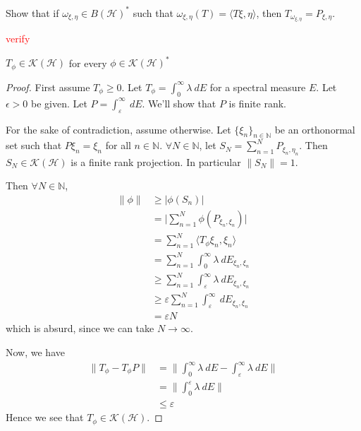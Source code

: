 

\begin{exercise}
  Show that if $\omega_{\xi, \eta} \in B(\mathcal{H})^*$ such that
  $\omega_{\xi, \eta}(T) = \langle T \xi ,  \eta \rangle $, then
  $T_{\omega_{\xi, \eta}} = P_{\xi, \eta}$.
\end{exercise}
\begin{solution}
  \textcolor{red}{verify}
\end{solution}

\begin{theorem}
  $T_\phi \in \mathcal{K}(\mathcal{H})$ for every $\phi \in
  \mathcal{K}(\mathcal{H})^*$
\end{theorem}
\begin{proof}
  First assume $T_\phi \ge 0$. Let $T_\phi = \int_{0}^{\infty}
  \lambda \ d E$ for a spectral measure $E$. Let $\epsilon > 0$ be
  given. Let $P = \int_{\varepsilon}^{\infty}  \ dE$. We'll show that
  $P$ is finite rank.

  For the sake of contradiction, assume
  otherwise. Let $\{ \xi_n \}_{n \in \mathbb{N}}$ be an orthonormal
  set such that $P \xi_n =  \xi_n$ for all $n \in \mathbb{N}$.
  $\forall N \in \mathbb{N}$, let $S_N = \sum_{n = 1}^{N} P_{\xi_n,
  \eta_n}$. Then $S_N \in \mathcal{K}(\mathcal{H})$ is a finite rank
  projection. In particular $\|S_N\| = 1$.

  Then $\forall N \in \mathbb{N}$,
  \begin{align*}
    \|\phi\| & \ge |\phi(S_n)| \\
    & = \Big| \sum_{ n = 1}^{N} \phi(P_{\xi_n, \xi_n}) \Big| \\
    & = \sum_{n = 1}^{N} \langle T_\phi \xi_n , \xi_n \rangle \\
    & = \sum_{n = 1}^{N} \int_{0}^{\infty}  \lambda \ d E_{\xi_n, \xi_n} \\
    & \ge \sum_{n = 1}^{N} \int_{\varepsilon}^{\infty}  \lambda \ d
    E_{\xi_n, \xi_n} \\
    & \ge \varepsilon \sum_{n = 1}^{N} \int_{\varepsilon}^{\infty}
    \ d E_{\xi_n, \xi_n} \\
    &= \varepsilon N
  \end{align*}
  which is absurd, since we can take $N \to \infty$.

  Now, we have
  \begin{align*}
    \|T_\phi - T_\phi P\| &= \Big \| \int_{0}^{\infty}  \lambda \ d E
    - \int_{\varepsilon}^{\infty}  \lambda \ d E \Big \| \\
    &= \Big \|\int_{0}^{\varepsilon}  \lambda \ d E \Big \| \\
    & \le \varepsilon
  \end{align*}
  Hence we see that $T_\phi \in \mathcal{K}(\mathcal{H})$.


\end{proof}
